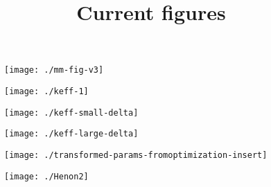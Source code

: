 \documentclass[11pt]{article}
\title{Current figures}
\begin{document}
\maketitle

\begin{figure}[htbp]
  \centering
  \texttt{[image: ./mm-fig-v3]}
\end{figure}

\begin{figure}[htbp]
  \centering
  \texttt{[image: ./keff-1]}
\end{figure}

\begin{figure}[htbp]
  \centering
  \texttt{[image: ./keff-small-delta]}
\end{figure}

\begin{figure}[htbp]
  \centering
  \texttt{[image: ./keff-large-delta]}
\end{figure}

\begin{figure}[htbp]
  \centering
  \texttt{[image: ./transformed-params-fromoptimization-insert]}
\end{figure}

\begin{figure}[htbp]
  \centering
  \texttt{[image: ./Henon2]}
\end{figure}
\end{document}
